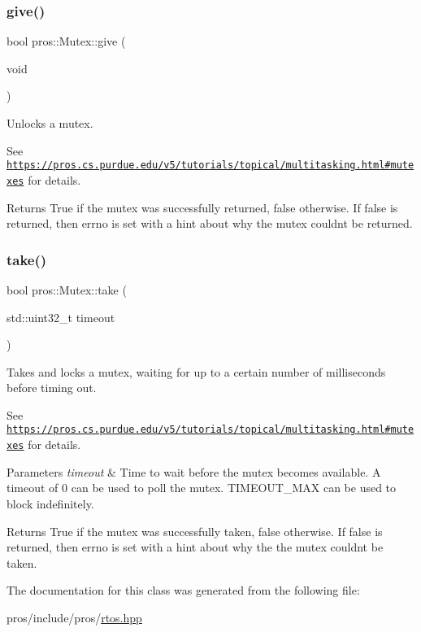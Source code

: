 \subsubsection{\texorpdfstring{give()}{give()}}
{\footnotesize\ttfamily bool pros\+::\+Mutex\+::give (\begin{DoxyParamCaption}\item[{void}]{ }\end{DoxyParamCaption})}

Unlocks a mutex.

See \href{https://pros.cs.purdue.edu/v5/tutorials/topical/multitasking.html#mutexes}{\tt https\+://pros.\+cs.\+purdue.\+edu/v5/tutorials/topical/multitasking.\+html\#mutexes} for details.

\begin{DoxyReturn}{Returns}
True if the mutex was successfully returned, false otherwise. If false is returned, then errno is set with a hint about why the mutex couldn\textquotesingle{}t be returned. 
\end{DoxyReturn}
\mbox{\label{classpros_1_1Mutex_a70da733375f7b4b68475881578c78516}} 
\subsubsection{\texorpdfstring{take()}{take()}}
{\footnotesize\ttfamily bool pros\+::\+Mutex\+::take (\begin{DoxyParamCaption}\item[{std\+::uint32\+\_\+t}]{timeout }\end{DoxyParamCaption})}

Takes and locks a mutex, waiting for up to a certain number of milliseconds before timing out.

See \href{https://pros.cs.purdue.edu/v5/tutorials/topical/multitasking.html#mutexes}{\tt https\+://pros.\+cs.\+purdue.\+edu/v5/tutorials/topical/multitasking.\+html\#mutexes} for details.


\begin{DoxyParams}{Parameters}
{\em timeout} & Time to wait before the mutex becomes available. A timeout of 0 can be used to poll the mutex. T\+I\+M\+E\+O\+U\+T\+\_\+\+M\+AX can be used to block indefinitely.\\
\hline
\end{DoxyParams}
\begin{DoxyReturn}{Returns}
True if the mutex was successfully taken, false otherwise. If false is returned, then errno is set with a hint about why the the mutex couldn\textquotesingle{}t be taken. 
\end{DoxyReturn}


The documentation for this class was generated from the following file\+:\begin{DoxyCompactItemize}
\item 
pros/include/pros/\hyperlink{rtos_8hpp}{rtos.\+hpp}\end{DoxyCompactItemize}
